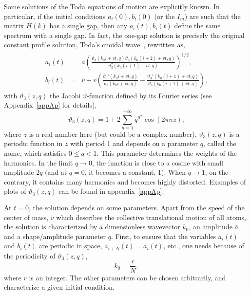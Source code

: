 \documentclass[]{revtex4-1}
\begin{document}
Some solutions of the Toda equations of motion are explicitly known. In particular, if the initial conditions $a_i(0), b_i(0)$ (or the $I_m$) are such that the matrix $H(k)$ has a single gap, then any $a_i(t),b_i(t)$ define the same spectrum with a single gap. 
 In fact, the one-gap solution is precisely the original constant profile solution, Toda's cnoidal wave~\cite{Toda}, rewritten as,
 \begin{eqnarray}
   \begin{aligned}
  a_i(t)&=& \bar{a} \left( \frac{\vartheta_3(k_0i+vt,q)\vartheta_3(k_0(i+2)+vt,q)}{\vartheta_3^2(k_0(i+1)+vt,q)} \right)^{1/2}, \label{Todasola}\\
  b_i(t) &=& \bar{v}+ v \left(\frac{\vartheta_3'(k_0 i+vt,q)}{\vartheta_3(k_0 i+vt,q)}- \frac{\vartheta_3'(k_0(i+1)+vt,q)}{\vartheta_3(k_0(i+1)+vt,q)} \right), %
   \end{aligned}
  \end{eqnarray}
with $\vartheta_3(z,q)$ the Jacobi $\vartheta$-function defined by its Fourier series (see Appendix~\ref{appAp} for details),
\begin{equation}
\vartheta_3(z,q)=  1 + 2\sum_{n=1}^{+\infty} q^{n^2} \cos(2\pi n z), \label{Fourierseries}
\end{equation}
where $z$ is a real number here (but could be a complex number). $\vartheta_3(z,q)$ is a periodic function in $z$ with period 1 and depends on a parameter $q$, called the nome, which satisfies $0\leq q<1$. This parameter determines the weights of the harmonics. In the limit $q\rightarrow 0$, the function is close to a cosine with small amplitude $2q$ (and at $q=0$, it becomes a constant, $1$). When $q \rightarrow 1$, on the contrary, it contains many harmonics and becomes highly distorted. Examples of plots of $\vartheta_3(z,q)$ can be found in appendix~\ref{appAp}. 

At $t=0$, the solution depends on some parameters. Apart from the speed of the center of mass, $\bar{v}$ which describes the collective translational motion of all atoms, the solution is characterized by a dimensionless wavevector $k_0$, an amplitude $\bar{a}$ and a shape/amplitude parameter $q$.  First, to ensure that the variables $a_i(t)$ and $b_i(t)$ are periodic in space, $a_{i+N}(t)=a_i(t)$, etc., one needs because of the periodicity of $\vartheta_3(z,q)$, \begin{equation} k_0=\frac{r}{N}, \end{equation} where $r$ is an integer. The other parameters can be chosen arbitrarily, and characterize a given initial condition.
\end{document}
